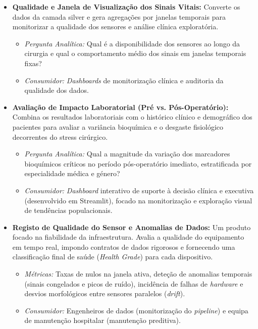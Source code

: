 \begin{itemize}
	\item \textbf{Qualidade e Janela de Visualização dos Sinais Vitais:} Converte os dados da camada silver e gera agregações por janelas temporais para monitorizar a qualidade dos sensores e análise clínica exploratória.
	\begin{itemize}
		\item \textit{Pergunta Analítica:} Qual é a disponibilidade dos sensores ao longo da cirurgia e qual o comportamento médio dos sinais em janelas temporais fixas?
		\item \textit{Consumidor:} \textit{Dashboards} de monitorização clínica e auditoria da qualidade dos dados.
	\end{itemize}
	
	\item \textbf{Avaliação de Impacto Laboratorial (Pré vs. Pós-Operatório):} Combina os resultados laboratoriais com o histórico clínico e demográfico dos pacientes para avaliar a variância bioquímica e o desgaste fisiológico decorrentes do stress cirúrgico.
	\begin{itemize}
		\item \textit{Pergunta Analítica:} Qual a magnitude da variação dos marcadores bioquímicos críticos no período pós-operatório imediato, estratificada por especialidade médica e género?
		\item \textit{Consumidor:} \textit{Dashboard} interativo de suporte à decisão clínica e executiva (desenvolvido em Streamlit), focado na monitorização e exploração visual de tendências populacionais.
	\end{itemize}
	
	\item \textbf{Registo de Qualidade do Sensor e Anomalias de Dados:} Um produto focado na fiabilidade da infraestrutura. Avalia a qualidade do equipamento em tempo real, impondo contratos de dados rigorosos e fornecendo uma classificação final de saúde (\textit{Health Grade}) para cada dispositivo.
	\begin{itemize}
		\item \textit{Métricas:} Taxas de nulos na janela ativa, deteção de anomalias temporais (sinais congelados e picos de ruído), incidência de falhas de \textit{hardware} e desvios morfológicos entre sensores paralelos (\textit{drift}).
		\item \textit{Consumidor:} Engenheiros de dados (monitorização do \textit{pipeline}) e equipa de manutenção hospitalar (manutenção preditiva).
	\end{itemize}
	

\end{itemize}
